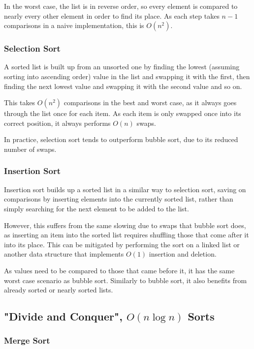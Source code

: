 \documentclass[]{article}
\begin{document}
In the worst case, the list is in reverse order, so every element is compared to nearly every other element in order to find its place. As each step takes $n - 1$ comparisons in a naive implementation, this is $O(n^2)$.

\subsubsection{Selection Sort}

A sorted list is built up from an unsorted one by finding the lowest (assuming sorting into ascending order) value in the list and swapping it with the first, then finding the next lowest value and swapping it with the second value and so on.

This takes $O(n^2)$ comparisons in the best and worst case, as it always goes through the list once for each item. As each item is only swapped once into its correct position, it always performs $O(n)$ swaps.

In practice, selection sort tends to outperform bubble sort, due to its reduced number of swaps.

\subsubsection{Insertion Sort}

Insertion sort builds up a sorted list in a similar way to selection sort, saving on comparisons by inserting elements into the currently sorted list, rather than simply searching for the next element to be added to the list.

However, this suffers from the same slowing due to swaps that bubble sort does, as inserting an item into the sorted list requires shuffling those that come after it into its place. This can be mitigated by performing the sort on a linked list or another data structure that implements $O(1)$ insertion and deletion.

As values need to be compared to those that came before it, it has the same worst case scenario as bubble sort. Similarly to bubble sort, it also benefits from already sorted or nearly sorted lists.

\pagebreak

\subsection{"Divide and Conquer", $O(n\log{n})$ Sorts}

\subsubsection{Merge Sort}
\end{document}
